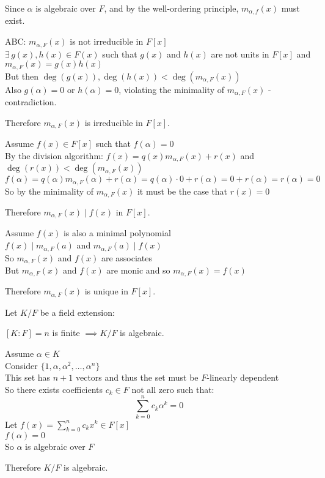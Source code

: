 \documentclass[letterpaper,12pt,fleqn]{article}
\renewcommand{\a}{\alpha}
\begin{document}
\begin{theproof}
  Since $\a$ is algebraic over $F$, and by the well-ordering principle, $m_{\a,f}(x)$
  must exist.

  ABC: $m_{\a,F}(x)$ is not irreducible in $F[x]$ \\
  $\exists\,g(x),h(x)\in F(x)$ such that $g(x)$ and $h(x)$ are not units in $F[x]$ and
  $m_{\a,F}(x)=g(x)h(x)$ \\
  But then $\deg(g(x)),\deg(h(x))<\deg(m_{\a,F}(x))$ \\
  Also $g(\a)=0$ or $h(\a)=0$, violating the minimality of $m_{\a,F}(x)$ - contradiction.

  Therefore $m_{\a,F}(x)$ is irreducible in $F[x]$.

  Assume $f(x)\in F[x]$ such that $f(\a)=0$ \\
  By the division algorithm: $f(x)=q(x)m_{\a,F}(x)+r(x)$ and
  $\deg(r(x))<\deg(m_{\a,F}(x))$ \\
  $f(\a)=q(\a)m_{\a,F}(\a)+r(\a)=q(\a)\cdot0+r(\a)=0+r(\a)=r(\a)=0$ \\
  So by the minimality of $m_{\a,F}(x)$ it must be the case that $r(x)=0$

  Therefore $m_{\a,F}(x)\mid f(x)$ in $F[x]$.

  Assume $f(x)$ is also a minimal polynomial \\
  $f(x)\mid m_{\a,F}(a)$ and $m_{\a,F}(a)\mid f(x)$ \\
  So $m_{\a,F}(x)$ and $f(x)$ are associates \\
  But $m_{\a,F}(x)$ and $f(x)$ are monic and so $m_{\a,F}(x)=f(x)$

  Therefore $m_{\a,F}(x)$ is unique in $F[x]$.
\end{theproof}

\begin{theorem}
  Let $K/F$ be a field extension:

  $[K:F]=n$ is finite $\implies K/F$ is algebraic.
\end{theorem}

\begin{theproof}
  Assume $\a\in K$ \\
  Consider $\{1,\a,\a^2,\ldots,\a^n\}$ \\
  This set has $n+1$ vectors and thus the set must be $F$-linearly dependent \\
  So there exists coefficients $c_k\in F$ not all zero such that:
  \[\sum_{k=0}^nc_k\a^k=0\]
  Let $f(x)=\sum_{k=0}^nc_kx^k\in F[x]$ \\
  $f(\a)=0$ \\
  So $\a$ is algebraic over $F$
  
  Therefore $K/F$ is algebraic.
\end{theproof}
\end{document}
